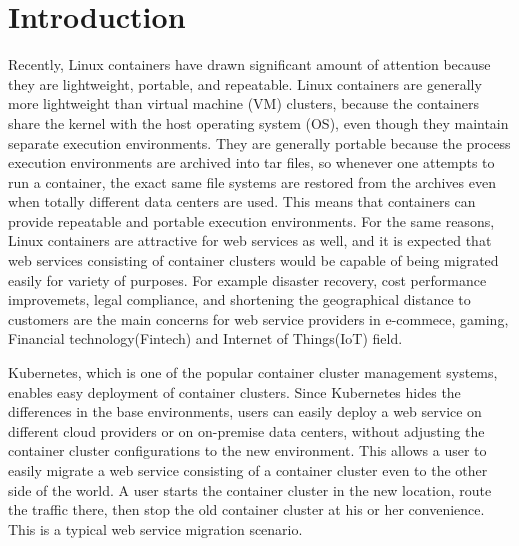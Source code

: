 \section{Introduction}

Recently, Linux containers have drawn significant amount of attention because they are lightweight, portable, and repeatable.
Linux containers are generally more lightweight than virtual machine (VM) clusters, 
because the containers share the kernel with the host operating system (OS), even though they maintain separate execution environments. 
They are generally portable because the process execution environments are archived into tar files, 
so whenever one attempts to run a container, the exact same file systems are restored from the archives 
even when totally different data centers are used. 
This means that containers can provide repeatable and portable execution environments.
%
For the same reasons, Linux containers are attractive for web services as well, 
and it is expected that web services consisting of container clusters would be 
capable of being migrated easily for variety of purposes. For example disaster recovery, 
cost performance improvemets, legal compliance, and shortening the geographical distance to customers 
are the main concerns for web service providers in e-commece, gaming, Financial technology(Fintech) and Internet of Things(IoT) field.
%

Kubernetes\cite{K8s2017}, which is one of the popular container cluster management systems, 
enables easy deployment of container clusters.
Since Kubernetes hides the differences in the base environments, users can easily deploy a web service on different 
cloud providers or on on-premise data centers, without adjusting the container cluster configurations to the new environment. 
This allows a user to easily migrate a web service consisting of a container cluster even to the other side of the world. 
A user starts the container cluster in the new location, route the traffic there, 
then stop the old container cluster at his or her convenience.
This is a typical web service migration scenario.

